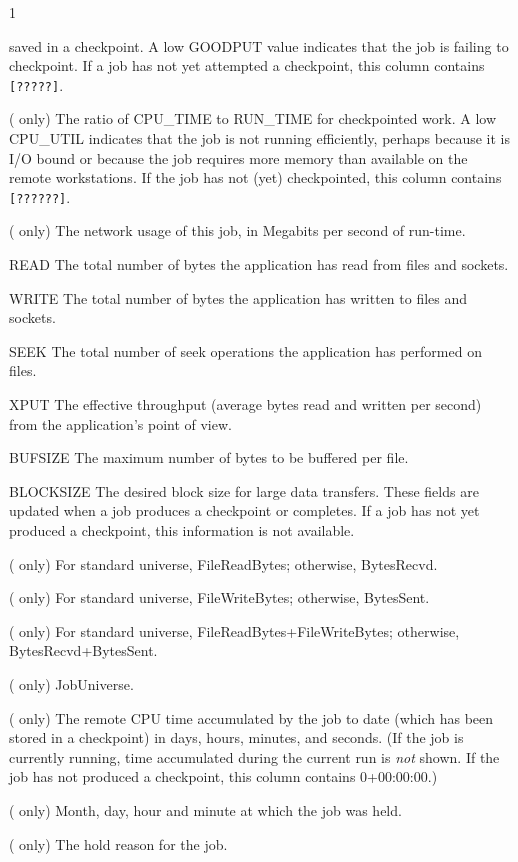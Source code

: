\begin{ManPage}{\label{man-condor-q}}{1}
\begin{description}
  saved in a checkpoint.  A low GOODPUT value indicates that the job is
  failing to checkpoint.  If a job has not yet attempted a checkpoint,
  this column contains \texttt{[?????]}.
\item[CPU\_UTIL] ( only) The ratio of CPU\_TIME to RUN\_TIME for checkpointed
  work.  A low CPU\_UTIL indicates that the job is not running
  efficiently, perhaps because it is I/O bound or because the job
  requires more memory than available on the remote workstations.  If
  the job has not (yet) checkpointed, this column contains \texttt{[??????]}.
\item[Mb/s] ( only) The network usage of this job, in
  Megabits per second of run-time.
  \item{READ} The total number of bytes the application has read from
    files and sockets.
  \item{WRITE} The total number of bytes the application has written to
    files and sockets.
  \item{SEEK} The total number of seek operations the application has
    performed on files.
  \item{XPUT} The effective throughput (average bytes read and written
    per second)
  from the application's point of view.
  \item{BUFSIZE} The maximum number of bytes to be buffered per file.
  \item{BLOCKSIZE} The desired block size for large data transfers.
    These fields are updated when a job produces a checkpoint or completes.
    If a job has not yet produced a checkpoint, this information is not
    available.
\item[INPUT] ( only) For standard universe, FileReadBytes;
    otherwise, BytesRecvd.
\item[OUTPUT] ( only) For standard universe, FileWriteBytes;
    otherwise, BytesSent.
\item[RATE] ( only) For standard universe,
    FileReadBytes+FileWriteBytes; otherwise, BytesRecvd+BytesSent.
\item[MISC] ( only) JobUniverse.
\item[CPU\_TIME] ( only) The remote CPU time accumulated by
  the job to date
  (which has been stored in a checkpoint) in days, hours, minutes, and
  seconds.  (If the job is currently running, time accumulated during
  the current run is \emph{not} shown.  If the job has not produced a
  checkpoint, this column contains 0+00:00:00.)
\item[HELD\_SINCE] ( only) Month, day, hour and minute
  at which the job was held.
\item[HOLD\_REASON] ( only) The hold reason for the job.
\end{description}


\end{ManPage}
